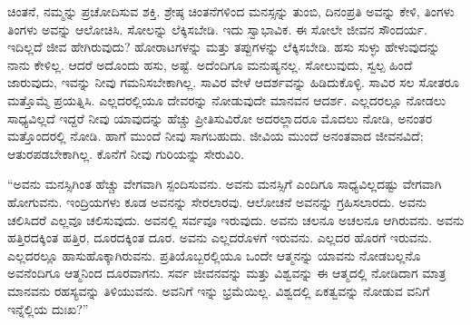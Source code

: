 ಚಿಂತನೆ, ನಮ್ಮನ್ನು ಪ್ರಚೋದಿಸುವ ಶಕ್ತಿ. ಶ್ರೇಷ್ಠ ಚಿಂತನೆಗಳಿಂದ ಮನಸ್ಸನ್ನು ತುಂಬಿ, ದಿನಂಪ್ರತಿ ಅವನ್ನು ಕೇಳಿ, ತಿಂಗಳು ತಿಂಗಳು ಅವನ್ನು ಆಲೋಚಿಸಿ. ಸೋಲನ್ನು ಲೆಕ್ಕಿಸಬೇಡಿ. ಇದು ಸ್ವಾಭಾವಿಕ. ಈ ಸೋಲೇ ಜೀವನ ಸೌಂದರ್ಯ. ಇದಿಲ್ಲದೆ ಜೀವ ಹೇಗಿರುವುದು? ಹೋರಾಟಗಳನ್ನು ಮತ್ತು ತಪ್ಪುಗಳನ್ನು ಲೆಕ್ಕಿಸಬೇಡಿ. ಹಸು ಸುಳ್ಳು ಹೇಳುವುದನ್ನು ನಾನು ಕೇಳಿಲ್ಲ. ಆದರೆ ಅದೊಂದು ಹಸು, ಅಷ್ಟೆ. ಅದೆಂದಿಗೂ ಮನುಷ್ಯನಲ್ಲ. ಸೋಲುವುದು, ಸ್ವಲ್ಪ ಹಿಂದೆ ಜಾರುವುದು, ಇವನ್ನು ನೀವು ಗಮನಿಸಬೇಕಾಗಿಲ್ಲ. ಸಾವಿರ ವೇಳೆ ಆದರ್ಶವನ್ನು ಹಿಡಿದುಕೊಳ್ಳಿ. ಸಾವಿರ ಸಲ ಸೋತರೂ ಮತ್ತೊಮ್ಮೆ ಪ್ರಯತ್ನಿಸಿ. ಎಲ್ಲದರಲ್ಲಿಯೂ ದೇವರನ್ನು ನೋಡುವುದೇ ಮಾನವನ ಆದರ್ಶ. ಎಲ್ಲದರಲ್ಲೂ ನೋಡಲು ಸಾಧ್ಯವಿಲ್ಲದೆ ಇದ್ದರೆ ನೀವು ಯಾವುದನ್ನು ಹೆಚ್ಚು ಪ್ರೀತಿಸುವಿರೋ ಅದರಲ್ಲಾದರೂ ಮೊದಲು ನೋಡಿ, ಅನಂತರ ಮತ್ತೊಂದರಲ್ಲಿ ನೋಡಿ. ಹಾಗೆ ಮುಂದೆ ನೀವು ಸಾಗಬಹುದು. ಜೀವಿಯ ಮುಂದೆ ಅನಂತವಾದ ಜೀವನವಿದೆ; ಆತುರಪಡಬೇಕಾಗಿಲ್ಲ. ಕೊನೆಗೆ ನೀವು ಗುರಿಯನ್ನು ಸೇರುವಿರಿ.

“ಅವನು ಮನಸ್ಸಿಗಿಂತ ಹೆಚ್ಚು ವೇಗವಾಗಿ ಸ್ಪಂದಿಸುವನು. ಅವನು ಮನಸ್ಸಿಗೆ ಎಂದಿಗೂ ಸಾಧ್ಯವಿಲ್ಲದಷ್ಟು ವೇಗವಾಗಿ ಹೋಗುವನು. ಇಂದ್ರಿಯಗಳು ಕೂಡ ಅವನನ್ನು ಸೇರಲಾರವು. ಆಲೋಚನೆ ಅವನನ್ನು ಗ್ರಹಿಸಲಾರದು. ಅವನು ಚಲಿಸಿದರೆ ಎಲ್ಲವೂ ಚಲಿಸುವುದು. ಅವನಲ್ಲಿ ಸರ್ವವೂ ಇರುವುದು. ಅವನು ಚಲನೂ ಅಚಲನೂ ಆಗಿರುವನು. ಅವನು ಹತ್ತಿರದಕ್ಕಿಂತ ಹತ್ತಿರ, ದೂರದಕ್ಕಿಂತ ದೂರ. ಅವನು ಎಲ್ಲದರೊಳಗೆ ಇರುವನು. ಎಲ್ಲದರ ಹೊರಗೆ ಇರುವನು. ಎಲ್ಲದರಲ್ಲೂ ಹಾಸುಹೊಕ್ಕಾಗಿರುವನು. ಪ್ರತಿಯೊಬ್ಬರಲ್ಲಿಯೂ ಒಂದೇ ಆತ್ಮನನ್ನು ಯಾವನು ನೋಡಬಲ್ಲನೊ ಅವನೆಂದಿಗೂ ಆತ್ಮನಿಂದ ದೂರವಾಗನು. ಸರ್ವ ಜೀವನವನ್ನು ಮತ್ತು ವಿಶ್ವವನ್ನು ಈ ಆತ್ಮದಲ್ಲಿ ನೋಡಿದಾಗ ಮಾತ್ರ ಮಾನವನು ರಹಸ್ಯವನ್ನು ತಿಳಿಯುವನು. ಅವನಿಗೆ ಇನ್ನು ಭ್ರಮೆಯಿಲ್ಲ. ವಿಶ್ವದಲ್ಲಿ ಏಕತ್ವವನ್ನು ನೋಡುವ ವನಿಗೆ ಇನ್ನೆಲ್ಲಿಯ ದುಃಖ?”

